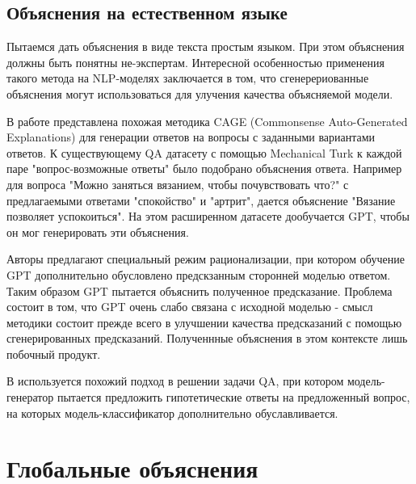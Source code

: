 \vspace{8mm}
\subsection{Объяснения на естественном языке}

Пытаемся дать объяснения в виде текста простым языком. При этом объяснения должны быть понятны не-экспертам. Интересной особенностью применения такого метода на NLP-моделях заключается в том, что сгенерериованные объяснения могут использоваться для улучения качества объясняемой модели.

В работе \cite{rajaniExplainYourselfLeveraging2019} представлена похожая методика CAGE (Commonsense Auto-Generated Explanations) для генерации ответов на вопросы с заданными вариантами ответов. К существующему QA датасету с помощью Mechanical Turk к каждой паре "вопрос-возможные ответы" было подобрано объяснения ответа. Например для вопроса "Можно заняться вязанием, чтобы почувствовать что?" с предлагаемыми ответами "спокойство" и "артрит", дается объяснение "Вязание позволяет успокоиться". На этом расширенном датасете дообучается GPT, чтобы он мог генерировать эти объяснения.

Авторы предлагают специальный режим рационализации, при котором обучение GPT дополнительно обусловлено предскзанным сторонней моделью ответом. Таким образом  GPT пытается объяснить полученное предсказание. Проблема состоит в том, что GPT очень слабо связана с исходной моделью - смысл методики состоит прежде всего в улучшении качества предсказаний с помощью сгенерированных предсказаний. Полученнные объяснения в этом контексте лишь побочный продукт.

В \cite{latcinnikExplainingQuestionAnswering2020} используется похожий подход в решении задачи QA, при котором модель-генератор пытается предложить гипотетические ответы на предложенный вопрос, на которых модель-классификатор дополнительно обуславливается. 


\vspace{15mm}
\section{Глобальные объяснения}

